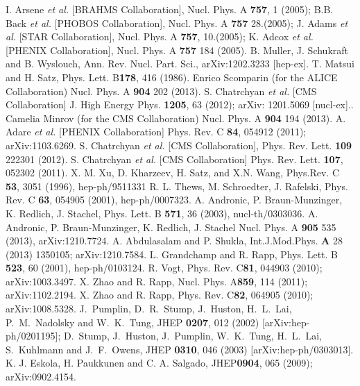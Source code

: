 \documentclass[aps,prc,preprint,superscriptaddress,showpacs,showkeys]{revtex4-1}
\begin{document}
\noindent
\begin{thebibliography}{100}
\medskip
{} I. Arsene {\it et al.} [BRAHMS Collaboration], Nucl. Phys. A {\bf 757}, 1 (2005); 
  B.B. Back {\it et al.} [PHOBOS Collaboration], Nucl. Phys. A {\bf 757} 28.(2005); 
  J. Adams {\it et al.} [STAR Collaboration], Nucl. Phys. A {\bf 757}, 10.(2005); 
  K. Adcox {\it et al.} [PHENIX Collaboration], Nucl. Phys. A {\bf 757} 184 (2005).
 B. Muller, J. Schukraft and B. Wyslouch, Ann. Rev. Nucl. Part. Sci., arXiv:1202.3233 [hep-ex].
 T. Matsui and H. Satz, Phys. Lett. B{\bf 178}, 416 (1986).
 Enrico Scomparin (for the ALICE Collaboration) Nucl. Phys. A {\bf 904} 202 (2013).
 S. Chatrchyan {\it et al.} [CMS Collaboration] J. High Energy Phys. {\bf 1205}, 63 (2012); arXiv: 1201.5069 [nucl-ex]..
 Camelia Minrov (for the CMS Collaboration) Nucl. Phys. A {\bf 904} 194 (2013).
 A. Adare {\it et al.} [PHENIX Collaboration] Phys. Rev. C {\bf 84}, 054912 (2011); arXiv:1103.6269.
 S. Chatrchyan {\it et al.} [CMS Collaboration], Phys. Rev. Lett. {\bf 109} 222301 (2012). 
 S. Chatrchyan {\it et al.} [CMS Collaboration] Phys. Rev. Lett. {\bf 107}, 052302 (2011).
 X. M. Xu, D. Kharzeev, H. Satz, and X.N. Wang, Phys.Rev. C {\bf 53}, 3051 (1996), hep-ph/9511331
 R. L. Thews, M. Schroedter, J. Rafelski, Phys. Rev. C {\bf 63}, 054905 (2001), hep-ph/0007323.
 A. Andronic, P. Braun-Munzinger, K. Redlich, J. Stachel, Phys. Lett. B {\bf 571}, 36 (2003), nucl-th/0303036.
 A. Andronic, P. Braun-Munzinger, K. Redlich, J. Stachel Nucl. Phys. A {\bf 905} 535 (2013), arXiv:1210.7724.
 A. Abdulasalam and P. Shukla, Int.J.Mod.Phys. {\bf A} 28 (2013) 1350105; arXiv:1210.7584.
 L. Grandchamp and R. Rapp, Phys. Lett. B {\bf 523}, 60 (2001), hep-ph/0103124.
 R. Vogt, Phys. Rev. C{\bf 81}, 044903 (2010); arXiv:1003.3497.
 X. Zhao and R. Rapp, Nucl. Phys. A{\bf 859}, 114 (2011); arXiv:1102.2194. 
 X. Zhao and R. Rapp, Phys. Rev. C{\bf 82}, 064905 (2010); arXiv:1008.5328.
 J.~Pumplin, D.~R.~Stump, J.~Huston, H.~L.~Lai, P.~M.~Nadolsky 
and W.~K.~Tung,  JHEP {\bf 0207}, 012 (2002) [arXiv:hep-ph/0201195];
  D.~Stump, J.~Huston, J.~Pumplin, W.~K.~Tung, H.~L.~Lai, S.~Kuhlmann  and J.~F.~Owens,
  JHEP {\bf 0310}, 046 (2003)  [arXiv:hep-ph/0303013].
 K. J. Eskola, H. Paukkunen and C. A. Salgado, JHEP{\bf 0904}, 065 (2009); arXiv:0902.4154.

\end{thebibliography}
\end{document}

